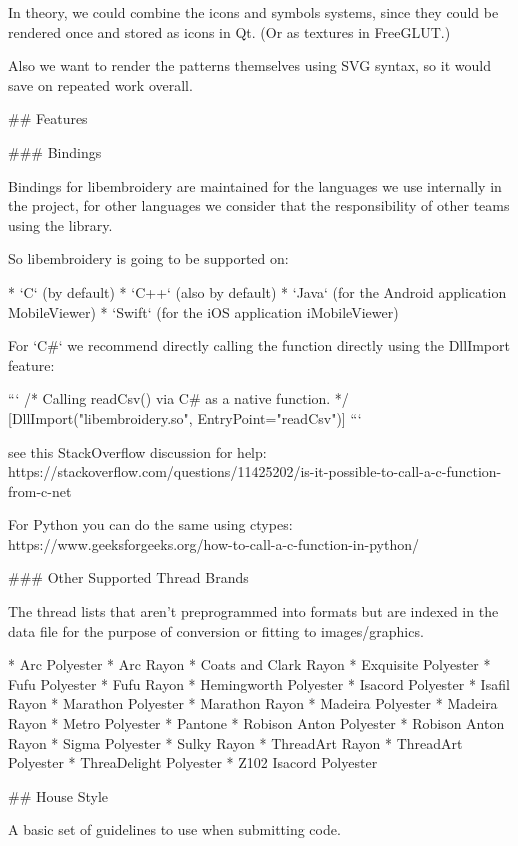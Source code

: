 In theory, we could combine the icons and symbols systems, since they could be
rendered once and stored as icons in Qt. (Or as textures in FreeGLUT.)

Also we want to render the patterns themselves using SVG syntax, so it would
save on repeated work overall.

## Features

### Bindings


Bindings for libembroidery are maintained for the languages we use internally
in the project, for other languages we consider that the responsibility of
other teams using the library.

So libembroidery is going to be supported on:

* `C` (by default)
* `C++` (also by default)
* `Java` (for the Android application MobileViewer)
* `Swift` (for the iOS application iMobileViewer)

For `C\#`  we recommend directly calling the function directly
using the DllImport feature:

```
/* Calling readCsv() via C# as a native function. */
[DllImport("libembroidery.so", EntryPoint="readCsv")]
```

see this StackOverflow discussion for help:
https://stackoverflow.com/questions/11425202/is-it-possible-to-call-a-c-function-from-c-net

For Python you can do the same using ctypes:
https://www.geeksforgeeks.org/how-to-call-a-c-function-in-python/

### Other Supported Thread Brands


The thread lists that aren't preprogrammed into formats but are indexed in
the data file for the purpose of conversion or fitting to images/graphics.

* Arc Polyester
* Arc Rayon
* Coats and Clark Rayon
* Exquisite Polyester
* Fufu Polyester
* Fufu Rayon
* Hemingworth Polyester
* Isacord Polyester
* Isafil Rayon
* Marathon Polyester
* Marathon Rayon
* Madeira Polyester
* Madeira Rayon
* Metro Polyester
* Pantone
* Robison Anton Polyester
* Robison Anton Rayon
* Sigma Polyester
* Sulky Rayon
* ThreadArt Rayon
* ThreadArt Polyester
* ThreaDelight Polyester
* Z102 Isacord Polyester

## House Style

A basic set of guidelines to use when submitting code.

